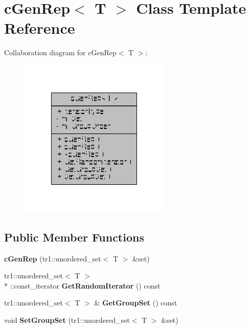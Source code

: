 \hypertarget{classcGenRep}{\section{c\-Gen\-Rep$<$ T $>$ Class Template Reference}
\label{classcGenRep}
}


Collaboration diagram for c\-Gen\-Rep$<$ T $>$\-:
\nopagebreak
\begin{figure}[H]
\begin{center}
\leavevmode
\includegraphics[width=204pt]{classcGenRep__coll__graph}
\end{center}
\end{figure}
\subsection*{Public Member Functions}
\begin{DoxyCompactItemize}
\item 
\hypertarget{classcGenRep_afc45eb5aac4afa26288e4ef1b6dc3c52}{{\bfseries c\-Gen\-Rep} (tr1\-::unordered\-\_\-set$<$ T $>$ \&set)}\label{classcGenRep_afc45eb5aac4afa26288e4ef1b6dc3c52}

\item 
\hypertarget{classcGenRep_afb8d7535bcd9e4fda83eceb2a2633c2c}{tr1\-::unordered\-\_\-set$<$ T $>$\\*
\-::const\-\_\-iterator {\bfseries Get\-Random\-Iterator} () const }\label{classcGenRep_afb8d7535bcd9e4fda83eceb2a2633c2c}

\item 
\hypertarget{classcGenRep_aa94ce954bd3a2aabaa54d46642141df9}{tr1\-::unordered\-\_\-set$<$ T $>$ \& {\bfseries Get\-Group\-Set} () const }\label{classcGenRep_aa94ce954bd3a2aabaa54d46642141df9}

\item 
\hypertarget{classcGenRep_a38819c49300c51669a631399302ea130}{void {\bfseries Set\-Group\-Set} (tr1\-::unordered\-\_\-set$<$ T $>$ \&set)}\label{classcGenRep_a38819c49300c51669a631399302ea130}

\end{DoxyCompactItemize}
